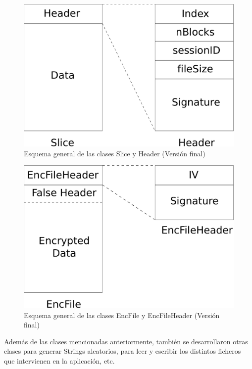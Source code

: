 \begin{figure}[ht]
  \centering
  \includegraphics[scale=0.4]{Figures/Slice_Header_2}
  \decoRule
  \caption[Slice - Header (Versión final)]{Esquema general de las clases Slice y Header (Versión final)}
  \label{fig:Slice_Header_2}
\end{figure}

\begin{figure}[ht]
  \centering
  \includegraphics[scale=0.4]{Figures/EncFile_Header_2}
  \decoRule
  \caption[EncFile - EncFileHeader (Versión final)]{Esquema general de las clases EncFile y EncFileHeader (Versión final)}
  \label{fig:EncFile_Header_2}
\end{figure}

Además de las clases mencionadas anteriormente, también se desarrollaron otras
clases para generar Strings aleatorios, para leer y escribir los distintos
ficheros que intervienen en la aplicación, etc.
